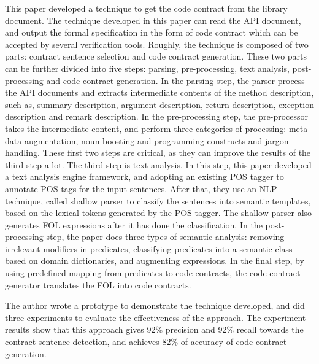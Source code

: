 \documentclass[11pt,letterpaper,oneside]{article}
\begin{document}
This paper developed a technique to get the code contract from the library document.
The technique developed in this paper can read the API document,
and output the formal specification in the form of code contract which can be accepted by several verification tools.
Roughly, the technique is composed of two parts: contract sentence selection and code contract generation.
These two parts can be further divided into five steps: parsing, pre-processing, text analysis, post-processing and code contract generation.
In the parsing step, the parser process the API documents and extracts intermediate contents of the method description, 
such as, summary description, argument description, return description, exception description and remark description. 
In the pre-processing step, the pre-processor takes the intermediate content, 
and perform three categories of processing: meta-data augmentation, noun boosting and programming constructs and jargon handling.
These first two steps are critical, as they can improve the results of the third step a lot.
The third step is text analysis.
In this step, this paper developed a text analysis engine framework, 
and adopting an existing POS tagger to annotate POS tags for the input sentences.
After that, they use an NLP technique, called shallow parser to classify the sentences into semantic templates,
based on the lexical tokens generated by the POS tagger.
The shallow parser also generates FOL expressions after it has done the classification.
In the post-processing step, the paper does three types of semantic analysis: removing irrelevant modifiers in predicates, classifying predicates into a semantic class based on domain dictionaries, and augmenting expressions.
In the final step, by using predefined mapping from predicates to code contracts,
the code contract generator translates the FOL into code contracts.

The author wrote a prototype to demonstrate the technique developed,
and did three experiments to evaluate the effectiveness of the approach. 
The experiment results show that this approach gives 92\% precision and 92\% recall towards the contract sentence detection,
and achieves 82\% of accuracy of code contract generation.



\end{document}
